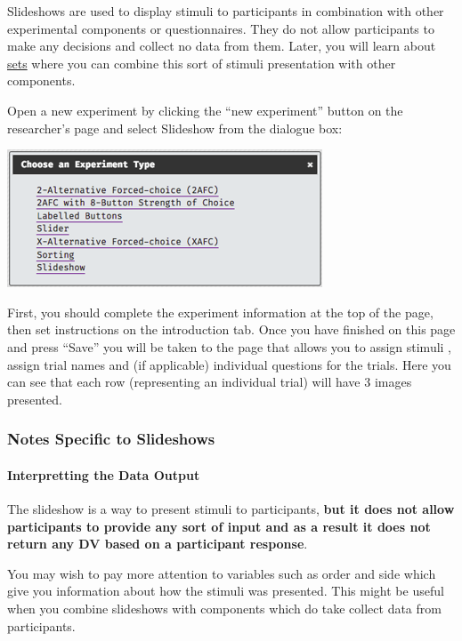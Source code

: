 \documentclass[]{book}
\let\oldparagraph\paragraph
\renewcommand{\paragraph}[1]{\oldparagraph{#1}\mbox{}}
\begin{document}
Slideshows are used to display stimuli to participants in combination
with other experimental components or questionnaires. They do not allow
participants to make any decisions and collect no data from them. Later,
you will learn about \protect\hyperlink{sets}{sets} where you can
combine this sort of stimuli presentation with other components.

Open a new experiment by clicking the ``new experiment'' button on the
researcher's page and select Slideshow from the dialogue box:

\includegraphics{images/screenshots/exp_2.png}

First, you should complete the experiment information at the top of the
page, then set instructions on the introduction tab. Once you have
finished on this page and press ``Save'' you will be taken to the page
that allows you to assign stimuli , assign trial names and (if
applicable) individual questions for the trials. Here you can see that
each row (representing an individual trial) will have 3 images
presented.

\subsubsection*{Notes Specific to
Slideshows}\label{notes-specific-to-slideshows}

\paragraph{Interpretting the Data
Output}\label{interpretting-the-data-output}

The slideshow is a way to present stimuli to participants, \textbf{but
it does not allow participants to provide any sort of input and as a
result it does not return any DV based on a participant response}.

You may wish to pay more attention to variables such as order and side
which give you information about how the stimuli was presented. This
might be useful when you combine slideshows with components which do
take collect data from participants.
\end{document}
